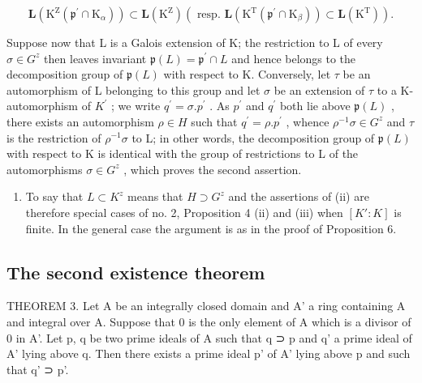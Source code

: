 \[
\mathbf {L} \left(\mathrm{K} ^ {\mathrm{Z}} \left(\mathfrak {p} ^ {\prime} \cap \mathrm{K} _ {\alpha}\right)\right) \subset \mathbf {L} \left(\mathrm{K} ^ {\mathrm{Z}}\right) (\text { resp. } \mathbf {L} \left(\mathrm{K} ^ {\mathrm{T}} \left(\mathfrak {p} ^ {\prime} \cap \mathrm{K} _ {\beta}\right)\right) \subset \mathbf {L} \left(\mathrm{K} ^ {\mathrm{T}}\right)).
\]

Suppose now that L is a Galois extension of K; the restriction to L of every \(\sigma\in G^{z}\) then leaves invariant \(\mathfrak{p}(L)=\mathfrak{p}^{\prime}\cap L\) and hence belongs to the decomposition group of \(\mathfrak{p}(L)\) with respect to K. Conversely, let \(\tau\) be an automorphism of L belonging to this group and let \(\sigma\) be an extension of \(\tau\) to a K-automorphism of \(K^{\prime}\) ; we write \(q^{\prime}=\sigma.p^{\prime}\) . As \(p^{\prime}\) and \(q^{\prime}\) both lie above \(\mathfrak{p}(L)\) , there exists an automorphism \(\rho\in H\) such that \(q^{\prime}=\rho.p^{\prime}\) , whence \(\rho^{-1}\sigma\in G^{z}\) and \(\tau\) is the restriction of \(\rho^{-1}\sigma\) to L; in other words, the decomposition group of \(\mathfrak{p}(L)\) with respect to K is identical with the group of restrictions to L of the automorphisms \(\sigma\in G^{z}\) , which proves the second assertion.

\begin{enumerate}
\def\labelenumi{(\roman{enumi})}
\setcounter{enumi}{1}
\tightlist
\item
  To say that \(L \subset K^{z}\) means that \(H \supset G^{z}\) and the assertions of (ii) are therefore special cases of no. 2, Proposition 4 (ii) and (iii) when \([K':K]\) is finite. In the general case the argument is as in the proof of Proposition 6.
\end{enumerate}

\subsection{The second existence theorem}

THEOREM 3. Let A be an integrally closed domain and A' a ring containing A and integral over A. Suppose that 0 is the only element of A which is a divisor of 0 in A'. Let p, q be two prime ideals of A such that q ⊃ p and q' a prime ideal of A' lying above q. Then there exists a prime ideal p' of A' lying above p and such that q' ⊃ p'.

